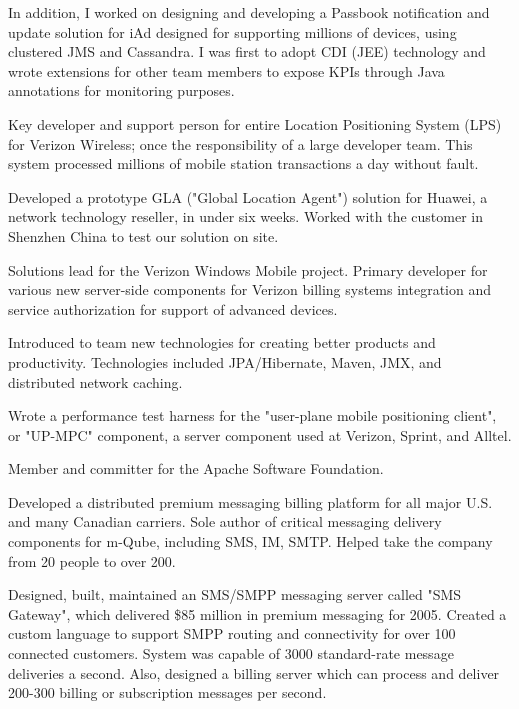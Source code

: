 \documentclass{article}
\begin{document}
In addition, I worked on designing and developing a Passbook notification
and update solution for iAd designed for supporting millions of devices,
using clustered JMS and Cassandra. I was first to adopt CDI (JEE)
technology and wrote extensions for other team members to expose KPIs
through Java annotations for monitoring purposes.

 

Key developer and support person for entire Location Positioning System
(LPS) for Verizon Wireless; once the responsibility of a large developer
team. This system processed millions of mobile station transactions a
day without fault.

Developed a prototype GLA ("Global Location Agent") solution for Huawei,
a network technology reseller, in under six weeks. Worked with the
customer in Shenzhen China to test our solution on site.

 

Solutions lead for the Verizon Windows Mobile project. Primary developer
for various new server-side components for Verizon billing systems
integration and service authorization for support of advanced devices.

Introduced to team new technologies for creating better products and
productivity. Technologies included JPA/Hibernate, Maven, JMX, and
distributed network caching.

Wrote a performance test harness for the "user-plane mobile positioning
client", or "UP-MPC" component, a server component used at Verizon,
Sprint, and Alltel.

Member and committer for the Apache Software Foundation.

 
Developed a distributed premium messaging billing platform for all major U.S.
and many Canadian carriers. Sole author of critical messaging delivery
components for m-Qube, including SMS, IM, SMTP. Helped take the company from
20 people to over 200.

Designed, built, maintained an SMS/SMPP messaging server called "SMS
Gateway", which delivered \$85 million in premium messaging for 2005.  Created
a custom language to support SMPP routing and connectivity for over 100
connected customers.  System was capable of 3000 standard-rate message
deliveries a second.  Also, designed a billing server which can process and
deliver 200-300 billing or subscription messages per second.
\end{document}
